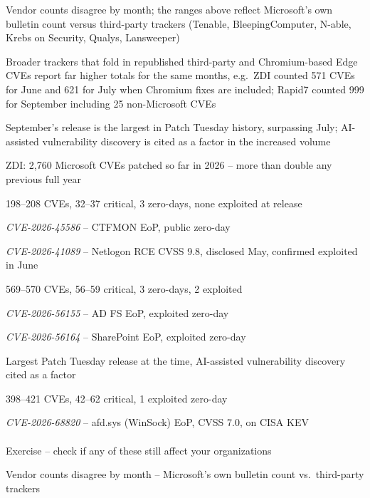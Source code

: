 \documentclass[Screen16to9,17pt]{foils}
\begin{document}
\begin{list2}
\item Vendor counts disagree by month; the ranges above reflect Microsoft's own bulletin count versus third-party trackers (Tenable, BleepingComputer, N-able, Krebs on Security, Qualys, Lansweeper)
\item Broader trackers that fold in republished third-party and Chromium-based Edge CVEs report far higher totals for the same months, e.g.\ ZDI counted 571 CVEs for June and 621 for July when Chromium fixes are included; Rapid7 counted 999 for September including 25 non-Microsoft CVEs
\item September's release is the largest in Patch Tuesday history, surpassing July; AI-assisted vulnerability discovery is cited as a factor in the increased volume
\item ZDI: 2,760 Microsoft CVEs patched so far in 2026 -- more than double any previous full year
\end{list2}

\begin{list2}
\item 198--208 CVEs, 32--37 critical, 3 zero-days, none exploited at release
\item \emph{CVE-2026-45586} -- CTFMON EoP, public zero-day
\item \emph{CVE-2026-41089} -- Netlogon RCE CVSS 9.8, disclosed May, confirmed exploited in June
\end{list2}

\begin{list2}
\item 569--570 CVEs, 56--59 critical, 3 zero-days, 2 exploited
\item \emph{CVE-2026-56155} -- AD FS EoP, exploited zero-day
\item \emph{CVE-2026-56164} -- SharePoint EoP, exploited zero-day
\item Largest Patch Tuesday release at the time, AI-assisted vulnerability discovery cited as a factor
\end{list2}

\begin{list2}
\item 398--421 CVEs, 42--62 critical, 1 exploited zero-day
\item \emph{CVE-2026-68820} -- afd.sys (WinSock) EoP, CVSS 7.0, on CISA KEV\\
\\
Exercise -- check if any of these still affect your organizations
\item Vendor counts disagree by month -- Microsoft's own bulletin count vs.\ third-party trackers
\end{list2}
\end{document}
